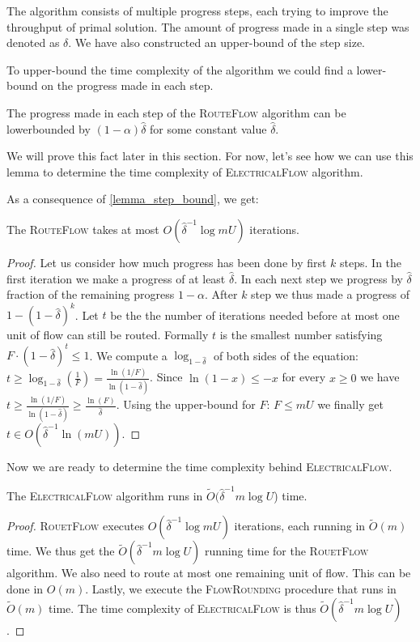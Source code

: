 The algorithm consists of multiple progress steps, each trying to improve the throughput of primal solution. The amount of progress made in a single step was denoted as $\delta$. We have also constructed an upper-bound of the step size.

To upper-bound the time complexity of the algorithm we could find a lower-bound on the progress made in each step.
\begin{lemma}\label{lemma_step_bound}
The progress made in each step of the \textsc{RouteFlow} algorithm can be lowerbounded by $(1-\alpha)\hat{\delta}$ for some constant value $\hat{\delta}$.
\end{lemma}
We will prove this fact later in this section. For now, let's see how we can use this lemma to determine the time complexity of \textsc{ElectricalFlow} algorithm.

As a consequence of \cref{lemma_step_bound}, we get:
\begin{lemma}
The \textsc{RouteFlow} takes at most $O(\hat{\delta}^{-1}\log mU)$ iterations.
\end{lemma}
\begin{proof}
Let us consider how much progress has been done by first $k$ steps. In the first iteration we make a progress of at least $\hat\delta$. In each next step we progress by $\hat\delta$ fraction of the remaining progress $1-\alpha$. After $k$ step we thus made a progress of $1-(1-\hat\delta)^k$.
Let $t$ be the the number of iterations needed before at most one unit of flow can still be routed. Formally $t$ is the smallest number satisfying $F\cdot(1-\hat\delta)^t \le  1$.
We compute a $\log_{1-\hat\delta}$ of both sides of the equation: $t \ge \log_{1-\hat\delta}(\frac{1}{F}) = \frac{\ln(1/F)}{\ln(1-\hat\delta)}$.
Since $\ln(1-x) \le -x$ for every $x\ge 0$ we have $t \ge \frac{\ln(1/F)}{\ln(1-\hat\delta)} \ge \frac{\ln(F)}{\hat\delta}$. Using the upper-bound for $F$: $F \le mU$ we finally get $t \in O(\hat\delta^{-1}\ln(mU))$.
\end{proof}

Now we are ready to determine the time complexity behind \textsc{ElectricalFlow}.
\begin{theorem}
The \textsc{ElectricalFlow} algorithm runs in $\tilde  O(\hat{\delta}^{-1}m\log U$) time.
\end{theorem}
\begin{proof}
\textsc{RouetFlow} executes $O(\hat{\delta}^{-1}\log mU)$ iterations, each running in $\tilde O(m)$ time. We thus get the $\tilde O(\hat{\delta}^{-1}m\log U)$ running time for the \textsc{RouetFlow} algorithm. We also need to route at most one remaining unit of flow. This can be done in $O(m)$. Lastly, we execute the \textsc{FlowRounding} procedure that runs in $\tilde O(m)$ time. The time complexity of \textsc{ElectricalFlow} is thus $\tilde  O(\hat{\delta}^{-1}m\log U)$.
\end{proof}

